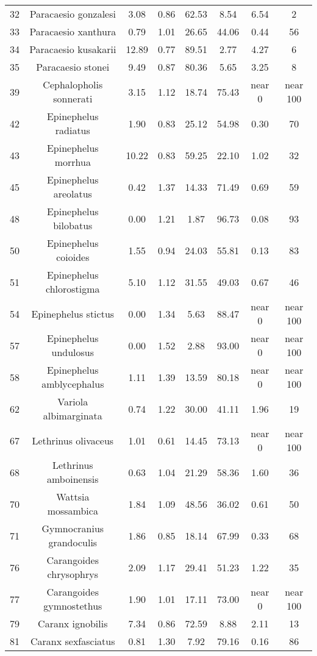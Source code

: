 \documentclass{report}\usepackage[]{graphicx}\usepackage[]{color}
\begin{document}
\begin{table}[ht]
{\begin{tabular}{cccccccc}
   32 & Paracaesio gonzalesi & 3.08 & 0.86 & 62.53 & 8.54 & 6.54 & 2 \\ 
   33 & Paracaesio xanthura & 0.79 & 1.01 & 26.65 & 44.06 & 0.44 & 56 \\ 
   34 & Paracaesio kusakarii & 12.89 & 0.77 & 89.51 & 2.77 & 4.27 & 6 \\ 
   35 & Paracaesio stonei & 9.49 & 0.87 & 80.36 & 5.65 & 3.25 & 8 \\ 
   39 & Cephalopholis sonnerati & 3.15 & 1.12 & 18.74 & 75.43 & near 0 & near 100 \\ 
   42 & Epinephelus radiatus & 1.90 & 0.83 & 25.12 & 54.98 & 0.30 & 70 \\ 
   43 & Epinephelus morrhua & 10.22 & 0.83 & 59.25 & 22.10 & 1.02 & 32 \\ 
   45 & Epinephelus areolatus & 0.42 & 1.37 & 14.33 & 71.49 & 0.69 & 59 \\ 
   48 & Epinephelus bilobatus & 0.00 & 1.21 & 1.87 & 96.73 & 0.08 & 93 \\ 
   50 & Epinephelus coioides & 1.55 & 0.94 & 24.03 & 55.81 & 0.13 & 83 \\ 
   51 & Epinephelus chlorostigma & 5.10 & 1.12 & 31.55 & 49.03 & 0.67 & 46 \\ 
   54 & Epinephelus stictus & 0.00 & 1.34 & 5.63 & 88.47 & near 0 & near 100 \\ 
   57 & Epinephelus undulosus & 0.00 & 1.52 & 2.88 & 93.00 & near 0 & near 100 \\ 
   58 & Epinephelus amblycephalus & 1.11 & 1.39 & 13.59 & 80.18 & near 0 & near 100 \\ 
   62 & Variola albimarginata & 0.74 & 1.22 & 30.00 & 41.11 & 1.96 & 19 \\ 
   67 & Lethrinus olivaceus & 1.01 & 0.61 & 14.45 & 73.13 & near 0 & near 100 \\ 
   68 & Lethrinus amboinensis & 0.63 & 1.04 & 21.29 & 58.36 & 1.60 & 36 \\ 
   70 & Wattsia mossambica & 1.84 & 1.09 & 48.56 & 36.02 & 0.61 & 50 \\ 
   71 & Gymnocranius grandoculis & 1.86 & 0.85 & 18.14 & 67.99 & 0.33 & 68 \\ 
   76 & Carangoides chrysophrys & 2.09 & 1.17 & 29.41 & 51.23 & 1.22 & 35 \\ 
   77 & Carangoides gymnostethus & 1.90 & 1.01 & 17.11 & 73.00 & near 0 & near 100 \\ 
   79 & Caranx ignobilis & 7.34 & 0.86 & 72.59 & 8.88 & 2.11 & 13 \\ 
   81 & Caranx sexfasciatus & 0.81 & 1.30 & 7.92 & 79.16 & 0.16 & 86 \\ 

\end{tabular}}
\end{table}
\end{document}
